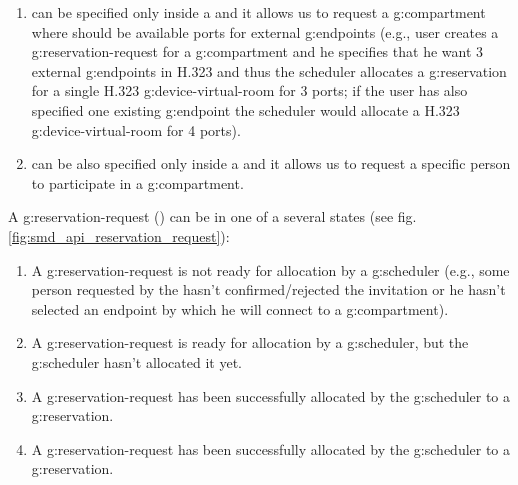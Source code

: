 \begin{enumerate}
\item {} can be specified only inside a  and it allows us to request a \gls{g:compartment} where should be available ports for external \glspl{g:endpoint} (e.g., user creates a \gls{g:reservation-request} for a \gls{g:compartment} and he specifies that he want 3 external \glspl{g:endpoint} in H.323 and thus the scheduler allocates a \gls{g:reservation} for a single H.323 \gls{g:device-virtual-room} for 3 ports; if the user has also specified one existing \gls{g:endpoint} the scheduler would allocate a H.323 \gls{g:device-virtual-room} for 4 ports).

\item {} can be also specified only inside a  and it allows us to request a specific person to participate in a \gls{g:compartment}.

\end{enumerate}

A \gls{g:reservation-request} () can be in one of a several states (see fig. \ref{fig:smd_api_reservation_request}):
\begin{enumerate}
\item {} A \gls{g:reservation-request} is not ready for allocation by a \gls{g:scheduler} (e.g., some person requested by the  hasn't confirmed/rejected the invitation or he hasn't selected an endpoint by which he will connect to a \gls{g:compartment}).
\item {} A \gls{g:reservation-request} is ready for allocation by a \gls{g:scheduler}, but the \gls{g:scheduler} hasn't allocated it yet.
\item {} A \gls{g:reservation-request} has been successfully allocated by the \gls{g:scheduler} to a \gls{g:reservation}.
\item {} A \gls{g:reservation-request} has been successfully allocated by the \gls{g:scheduler} to a \gls{g:reservation}.
\end{enumerate}

